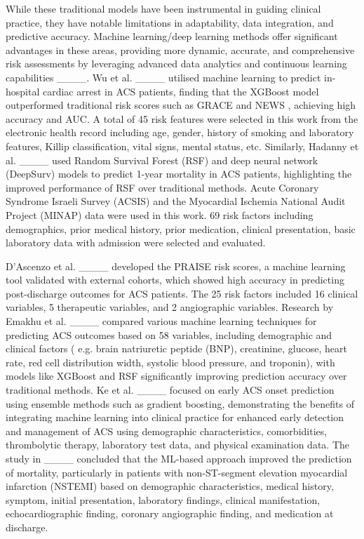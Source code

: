 While these traditional models have been instrumental in guiding clinical practice, they have notable limitations in adaptability, data integration, and predictive accuracy.  Machine learning/deep learning methods offer significant advantages in these areas, providing more dynamic, accurate, and comprehensive risk assessments by leveraging advanced data analytics and continuous learning capabilities ____.  Wu et al. ____ utilised machine learning to predict in-hospital cardiac arrest in ACS patients, finding that the XGBoost model outperformed traditional risk scores such as GRACE and NEWS , achieving high accuracy and AUC. A total of 45 risk features were selected in this work from the electronic health record including age, gender, history of smoking and laboratory features, Killip classification, vital signs, mental status, etc.  Similarly, Hadanny et al. ____ used Random Survival Forest (RSF) and deep neural network (DeepSurv) models to predict 1-year mortality in ACS patients, highlighting the improved performance of RSF over traditional methods. Acute Coronary Syndrome Israeli Survey (ACSIS) and the Myocardial Ischemia National Audit Project (MINAP) data were used in this work. 69 risk factors including demographics, prior medical history, prior medication, clinical presentation, basic laboratory data with admission were selected and evaluated.

D’Ascenzo et al. ____ developed the PRAISE risk scores, a machine learning tool validated with external cohorts, which showed high accuracy in predicting post-discharge outcomes for ACS patients. The 25 risk factors included 16 clinical variables, 5 therapeutic variables, and 2 angiographic variables. Research by Emakhu et al. ____ compared various machine learning techniques for predicting ACS outcomes based on 58 variables, including demographic and clinical factors ( e.g. brain natriuretic peptide (BNP), creatinine, glucose, heart rate, red cell distribution width, systolic blood pressure, and troponin), with models like XGBoost and RSF significantly improving prediction accuracy over traditional methods. Ke et al. ____ focused on early ACS onset prediction using ensemble methods such as gradient boosting, demonstrating the benefits of integrating machine learning into clinical practice for enhanced early detection and management of ACS using demographic characteristics, comorbidities, thrombolytic therapy, laboratory test data, and physical examination data. The study in ____ concluded that the ML-based approach improved the prediction of mortality, particularly in patients with non-ST-segment elevation myocardial infarction (NSTEMI) based on demographic characteristics, medical history, symptom, initial presentation, laboratory findings, clinical manifestation, echocardiographic finding, coronary angiographic finding, and medication at discharge. 


